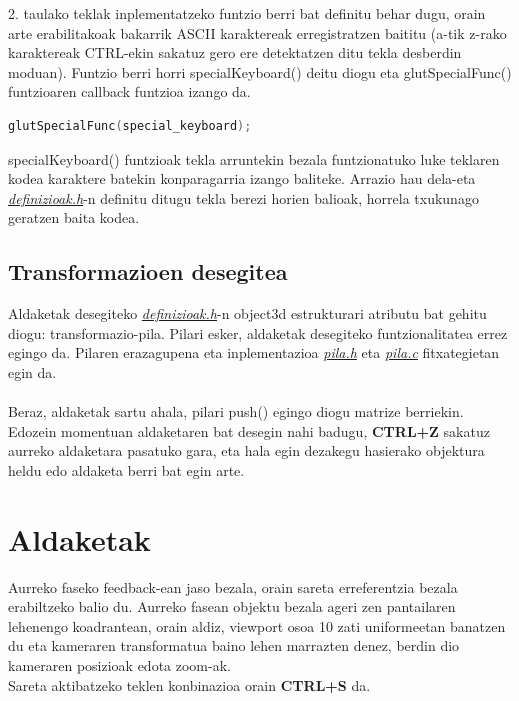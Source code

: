 \documentclass[12pt]{article}
\newcommand{\fitxategi}[1] {\underline{\textit{#1}}}
\newcommand{\tekla}[1] {\textbf{#1}}
\begin{document}
2. taulako teklak inplementatzeko funtzio berri bat definitu behar dugu, orain arte erabilitakoak bakarrik ASCII karaktereak erregistratzen baititu (a-tik z-rako karaktereak CTRL-ekin sakatuz gero ere detektatzen ditu tekla desberdin moduan).
Funtzio berri horri specialKeyboard() deitu diogu eta glutSpecialFunc()\cite{glutSpecialFunc} funtzioaren callback funtzioa\cite{callback} izango da.

\begin{center}
	\begin{lstlisting}[language=C, basicstyle=\footnotesize]
	glutSpecialFunc(special_keyboard);
	\end{lstlisting}
\end{center}

specialKeyboard() funtzioak tekla arruntekin bezala funtzionatuko luke teklaren kodea karaktere batekin konparagarria izango baliteke. Arrazio hau dela-eta \fitxategi{definizioak.h}-n definitu ditugu tekla berezi horien balioak, horrela txukunago geratzen baita kodea.




\subsection{Transformazioen desegitea}

Aldaketak desegiteko \fitxategi{definizioak.h}-n object3d estrukturari atributu bat gehitu diogu: transformazio-pila. Pilari esker, aldaketak desegiteko funtzionalitatea errez egingo da.
Pilaren erazagupena eta inplementazioa \fitxategi{pila.h} eta \fitxategi{pila.c} fitxategietan egin da.\\\\
Beraz, aldaketak sartu ahala, pilari push() egingo diogu matrize berriekin. Edozein momentuan aldaketaren bat desegin nahi badugu, \tekla{CTRL+Z} sakatuz aurreko aldaketara pasatuko gara, eta hala egin dezakegu hasierako objektura heldu edo aldaketa berri bat egin arte.

\section{Aldaketak}

Aurreko faseko feedback-ean jaso bezala, orain sareta erreferentzia bezala erabiltzeko balio du. Aurreko fasean objektu bezala ageri zen pantailaren lehenengo koadrantean, orain aldiz, viewport\cite{viewport} osoa 10 zati uniformeetan banatzen du eta kameraren transformatua baino lehen marrazten denez, berdin dio kameraren posizioak edota zoom-ak.\\
Sareta aktibatzeko teklen konbinazioa orain \tekla{CTRL+S} da.
\end{document}
